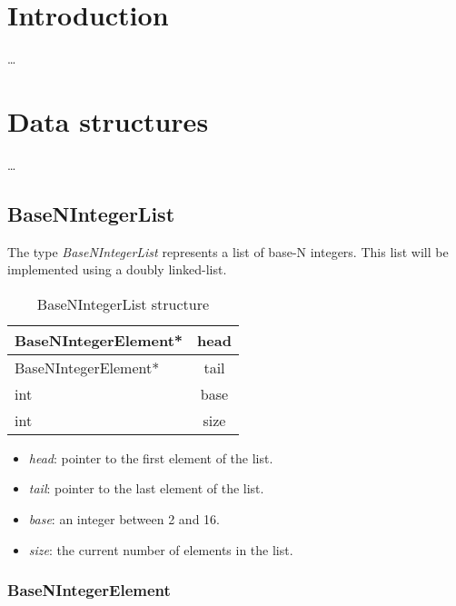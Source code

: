 \documentclass[book, nodocumentinfo]{upmethodology-document}
\begin{document}
\tableofcontents

\listofalgorithms


\chapter{Introduction}

…

\chapter{Data structures}

…

\section{BaseNIntegerList}

The type \emph{BaseNIntegerList} represents a list of base-N integers.
This list will be implemented using a doubly linked-list.

\begin{table}[h]
    \centering
    \label{tab:basenintegerlist-struct}

    \begin{tabular}{|l|c|}
        \hline
        BaseNIntegerElement* & head \\
        \hline
        BaseNIntegerElement* & tail \\
        \hline
        int & base \\
        \hline
        int & size \\
        \hline
    \end{tabular}

    \caption{BaseNIntegerList structure}
\end{table}

\begin{itemize}
    \item \emph{head}: pointer to the first element of the list.
    \item \emph{tail}: pointer to the last element of the list.
    \item \emph{base}: an integer between 2 and 16.
    \item \emph{size}: the current number of elements in the list.
\end{itemize}

\subsection{BaseNIntegerElement}
\end{document}

